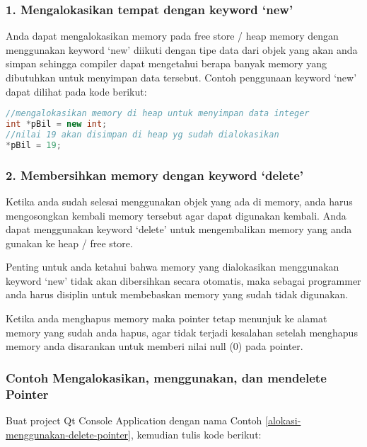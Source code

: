 \subsubsection{\texorpdfstring{1. Mengalokasikan tempat dengan keyword
`new'}{Mengalokasikan tempat dengan keyword new}}\label{mengalokasikan-tempat-dengan-keyword-new}

Anda dapat mengalokasikan memory pada free store / heap memory dengan
menggunakan keyword `new' diikuti dengan tipe data dari objek yang akan
anda simpan sehingga compiler dapat mengetahui berapa banyak memory yang
dibutuhkan untuk menyimpan data tersebut. Contoh penggunaan keyword
`new' dapat dilihat pada kode berikut:

\begin{lstlisting}[language=c++, numbers=none]
//mengalokasikan memory di heap untuk menyimpan data integer
int *pBil = new int;
//nilai 19 akan disimpan di heap yg sudah dialokasikan
*pBil = 19;
\end{lstlisting}

\subsubsection{\texorpdfstring{2. Membersihkan memory dengan keyword
`delete'}{Membersihkan memory dengan keyword delete}}\label{membersihkan-memory-dengan-keyword-delete}

Ketika anda sudah selesai menggunakan objek yang ada di memory, anda
harus mengosongkan kembali memory tersebut agar dapat digunakan kembali.
Anda dapat menggunakan keyword `delete' untuk mengembalikan memory yang
anda gunakan ke heap / free store.

Penting untuk anda ketahui bahwa memory yang dialokasikan menggunakan
keyword `new' tidak akan dibersihkan secara otomatis, maka sebagai
programmer anda harus disiplin untuk membebaskan memory yang sudah tidak
digunakan.

Ketika anda menghapus memory maka pointer tetap menunjuk ke alamat
memory yang sudah anda hapus, agar tidak terjadi kesalahan setelah
menghapus memory anda disarankan untuk memberi nilai null (0) pada
pointer.

\subsubsection*{Contoh  Mengalokasikan, menggunakan, dan mendelete Pointer}

Buat project Qt Console Application dengan nama Contoh \ref{alokasi-menggunakan-delete-pointer}, kemudian tulis
kode berikut:

